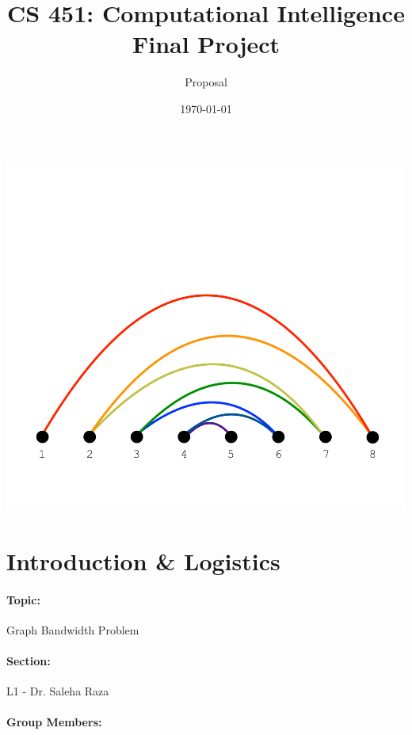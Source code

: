 \documentclass[answers]{exam}
\title{CS 451: Computational Intelligence \\ \Large Final Project}
\author{Proposal}
\date{\today}
\begin{document}
\maketitle
\paragraph{} \centering
\includegraphics[scale=0.4]{cover.png}
\paragraph{} \flushleft


\newpage
\tableofcontents

\newpage
\section{Introduction \& Logistics}
\paragraph{}
\paragraph{Topic:} Graph Bandwidth Problem
\paragraph{Section:} L1 - Dr. Saleha Raza
\paragraph{Group Members:}
\end{document}
